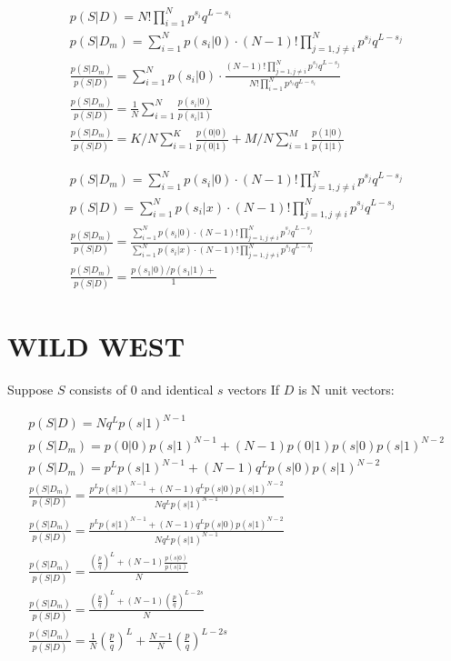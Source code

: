 \documentclass[11pt,draft]{article}
\begin{document}
\begin{align}
p(S|D) = N! \prod_{i=1}^N p^{s_i}q^{L-s_i}\\
p(S|D_m) =  \sum_{i=1}^{N}  p(s_i |0) \cdot (N-1)!  \prod_{j=1, j \neq i}^N p^{s_j}q^{L-s_j} \\
\frac{p(S|D_m)}{p(S|D)} = \sum_{i=1}^{N}  p(s_i |0) \cdot \frac{  (N-1)!  \prod_{j=1, j \neq i}^N p^{s_j}q^{L-s_j} } { N! \prod_{i=1}^N p^{s_i}q^{L-s_i}}  \\
\frac{p(S|D_m)}{p(S|D)} = \frac{1}{N}  \sum_{i=1}^{N}  \frac{p(s_i |0)}{ p(s_i |1)} \\
\frac{p(S|D_m)}{p(S|D)} = K/N  \sum_{i=1}^{K}  \frac{p(0 |0)}{ p(0 |1)} +  M/N  \sum_{i=1}^{M}  \frac{p(1 |0)}{ p(1 |1)} 
\end{align}




\begin{align}
p(S|D_m) =  \sum_{i=1}^{N}  p(s_i |0) \cdot (N-1)!  \prod_{j=1, j \neq i}^N p^{s_j}q^{L-s_j} \\
p(S|D) =  \sum_{i=1}^{N}  p(s_i |x) \cdot (N-1)!  \prod_{j=1, j \neq i}^N p^{s_j}q^{L-s_j} \\
\frac{p(S|D_m)}{p(S|D)} = \frac { \sum_{i=1}^{N}  p(s_i |0) \cdot (N-1)!  \prod_{j=1, j \neq i}^N p^{s_j}q^{L-s_j}  } { \sum_{i=1}^{N}  p(s_i |x) \cdot (N-1)!  \prod_{j=1, j \neq i}^N p^{s_j}q^{L-s_j}  } \\
\frac{p(S|D_m)}{p(S|D)} =  \frac { p(s_1|0)/p(s_1|1) + } { 1} 
\end{align}



\section{WILD WEST}

Suppose $S$ consists of  $0$ and identical $s$ vectors 
If  $D$ is N unit vectors:

\begin{align}
p(S|D) =  Nq^Lp(s|1)^{N-1}\\
p(S|D_m) = p(0|0) p(s|1)^{N-1} + (N-1) p(0|1)p(s|0)p(s|1)^{N-2} \\
p(S|D_m) = p^Lp(s|1)^{N-1} + (N-1) q^Lp(s|0)p(s|1)^{N-2}\\
\frac{p(S|D_m)}{p(S|D)} = \frac { p^Lp(s|1)^{N-1} + (N-1) q^Lp(s|0)p(s|1)^{N-2} } {  Nq^Lp(s|1)^{N-1}}\\
\frac{p(S|D_m)}{p(S|D)} = \frac { p^Lp(s|1)^{N-1} + (N-1) q^Lp(s|0)p(s|1)^{N-2} } {  Nq^Lp(s|1)^{N-1}}\\
\frac{p(S|D_m)}{p(S|D)} = \frac {\left ( \frac{p}{q} \right )^L + (N-1) \frac{p(s|0)}{p(s|1)} } { N}\\
\frac{p(S|D_m)}{p(S|D)} = \frac {\left ( \frac{p}{q} \right )^L + (N-1)\left ( \frac{p}{q} \right )^{L-2s} } { N} \\
\frac{p(S|D_m)}{p(S|D)} = \frac{1}{N}\left ( \frac{p}{q} \right )^L + \frac{N-1}{N}\left ( \frac{p}{q} \right )^{L-2s}\\
\end{align}
\end{document}
